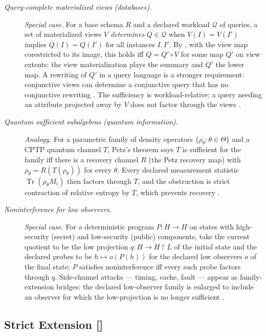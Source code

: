 \begin{description}
\item[\emph{Query-complete materialized views (databases).}] \textit{Special case.}
For a base schema \(R\) and a declared workload \(\mathcal Q\) of
queries, a set of materialized views \(V\) \emph{determines} \(Q\in\mathcal Q\)
when \(V(I)=V(I')\) implies \(Q(I)=Q(I')\) for all instances \(I,I'\). By
, with the view map corestricted to its image, this holds iff
\(Q=Q'\circ V\) for some map \(Q'\) on view extents; the view materialization
plays the summary and \(Q'\) the lower map. A rewriting of \(Q'\) in a query
language is a stronger requirement: conjunctive views can determine a
conjunctive query that has no conjunctive rewriting \citep{NashSegoufinVianu2010Views}.  The
sufficiency is workload-relative: a query needing an attribute
projected away by \(V\) does not factor through the views
\citep{Halevy2001AnsweringQueriesUsingViewsSurvey}.

\item[\emph{Quantum sufficient subalgebras (quantum information).}] \textit{Analogy.}
For a parametric family of density operators
\(\{\rho_\theta:\theta\in\Theta\}\) and a CPTP quantum channel \(T\),
Petz's theorem says \(T\) is sufficient for the family iff there is a
recovery channel \(R\) (the Petz recovery map) with
\(\rho_\theta=R(T(\rho_\theta))\) for every \(\theta\).  Every declared
measurement statistic \(\operatorname{Tr}(\rho_\theta M_i)\) then
factors through \(T\), and the obstruction is strict contraction of
relative entropy by \(T\), which prevents recovery
\citep{Petz1986SufficientSubalgebras}.

\item[\emph{Noninterference for low observers.}] \textit{Special case.}
For a deterministic program \(P:H\to H\) on states with high-security (secret) and low-security (public) components, take the current quotient to be the low projection \(q:H\to H{\restriction}L\) of the initial state and the declared probes to be \(h\mapsto o(P(h))\) for the declared low observers \(o\) of the final state; \(P\) satisfies noninterference iff every such probe factors through \(q\).  Side-channel attacks --- timing, cache,
fault --- appear as family-extension bridges: the declared
low-observer family is enlarged to include an observer for which the
low-projection is no longer sufficient
\citep{GoguenMeseguer1982SecurityPolicies,SabelfeldMyers2003LanguageBasedInformationFlow}.
\end{description}
\endgroup

\subsection{Strict Extension [\texorpdfstring{}{F8}]}\label{sec:stability:strict-extension}

